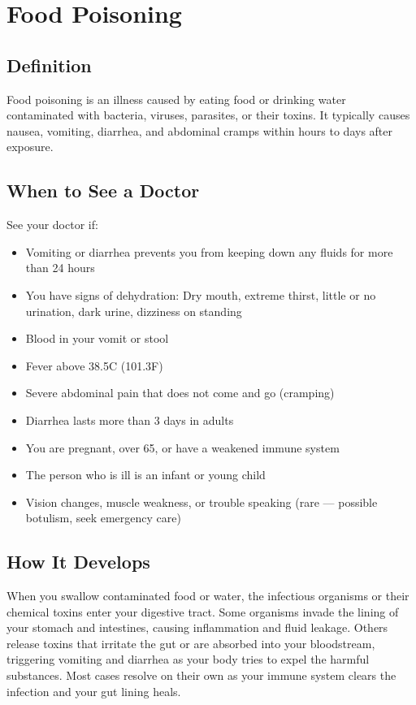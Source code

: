 \chapter{Food Poisoning}

\section*{Definition}
Food poisoning is an illness caused by eating food or drinking water contaminated with bacteria, viruses, parasites, or their toxins. It typically causes nausea, vomiting, diarrhea, and abdominal cramps within hours to days after exposure.

\section*{When to See a Doctor}
See your doctor if:
\begin{itemize}
  \item Vomiting or diarrhea prevents you from keeping down any fluids for more than 24 hours
  \item You have signs of dehydration: Dry mouth, extreme thirst, little or no urination, dark urine, dizziness on standing
  \item Blood in your vomit or stool
  \item Fever above 38.5\textdegree{}C (101.3\textdegree{}F)
  \item Severe abdominal pain that does not come and go (cramping)
  \item Diarrhea lasts more than 3 days in adults
  \item You are pregnant, over 65, or have a weakened immune system
  \item The person who is ill is an infant or young child
  \item Vision changes, muscle weakness, or trouble speaking (rare — possible botulism, seek emergency care)
\end{itemize}

\section*{How It Develops}
When you swallow contaminated food or water, the infectious organisms or their chemical toxins enter your digestive tract. Some organisms invade the lining of your stomach and intestines, causing inflammation and fluid leakage. Others release toxins that irritate the gut or are absorbed into your bloodstream, triggering vomiting and diarrhea as your body tries to expel the harmful substances. Most cases resolve on their own as your immune system clears the infection and your gut lining heals.

